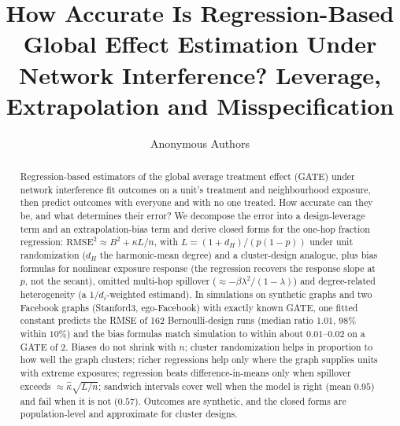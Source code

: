 \documentclass{article}
\title{How Accurate Is Regression-Based Global Effect Estimation Under Network Interference? Leverage, Extrapolation and Misspecification}
\author{Anonymous Authors}
\begin{document}
\maketitle

\begin{abstract}
Regression-based estimators of the global average treatment effect (GATE) under network interference fit outcomes on a unit's treatment and neighbourhood exposure, then predict outcomes with everyone and with no one treated. How accurate can they be, and what determines their error? We decompose the error into a design-leverage term and an extrapolation-bias term and derive closed forms for the one-hop fraction regression: $\mathrm{RMSE}^2\approx B^2+\kappa L/n$, with $L=(1+d_H)/(p(1-p))$ under unit randomization ($d_H$ the harmonic-mean degree) and a cluster-design analogue, plus bias formulas for nonlinear exposure response (the regression recovers the response slope at $p$, not the secant), omitted multi-hop spillover ($\approx-\beta\lambda^2/(1-\lambda)$) and degree-related heterogeneity (a $1/d_i$-weighted estimand). In simulations on synthetic graphs and two Facebook graphs (Stanford3, ego-Facebook) with exactly known GATE, one fitted constant predicts the RMSE of 162 Bernoulli-design runs (median ratio $1.01$, $98\%$ within $10\%$) and the bias formulas match simulation to within about $0.01$--$0.02$ on a GATE of $2$. Biases do not shrink with $n$; cluster randomization helps in proportion to how well the graph clusters; richer regressions help only where the graph supplies units with extreme exposures; regression beats difference-in-means only when spillover exceeds $\approx\hat\kappa\sqrt{L/n}$; sandwich intervals cover well when the model is right (mean $0.95$) and fail when it is not ($0.57$). Outcomes are synthetic, and the closed forms are population-level and approximate for cluster designs.
\end{abstract}












\appendix



\newpage

\end{document}
